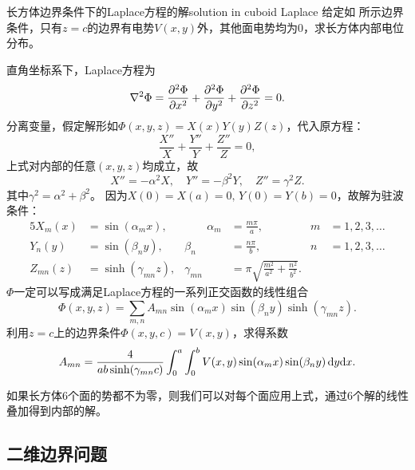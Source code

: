 \begin{example}{长方体边界条件下的Laplace方程的解}{solution in cuboid Laplace}
    给定如 所示边界条件，只有$z = c$的边界有电势$V(x,y)$外，其他面电势均为0，求长方体内部电位分布。
    \begin{notecaptionblock}
        \label{fig:cuboid boundary}
    \end{notecaptionblock}
    直角坐标系下，Laplace方程为
    \[
        \laplacian\Phi = \pv[2]\Phi x + \pv[2]\Phi y + \pv[2]\Phi z = 0.
    \]
    分离变量，假定解形如$\Phi(x,y,z) = X(x)Y(y)Z(z)$，代入原方程：
    \[
        \frac{X''}X + \frac{Y''}Y + \frac{Z''}Z = 0,
    \]
    上式对内部的任意$(x,y,z)$均成立，故
    \[
        X'' = -\alpha^2X,\quad Y'' = -\beta^2Y,\quad Z'' = \gamma^2Z.
    \]
    其中$\gamma^2 = \alpha^2 + \beta^2$。
    因为$X(0) = X(a) = 0,\,Y(0) = Y(b) = 0$，故解为驻波条件：
    \begin{alignat*}{5}
        X_m(x) &= \sin(\alpha_mx),&\qquad\alpha_m &= \frac{m\pi}a,&m &= 1,2,3,\ldots\\
        Y_n(y) &= \sin(\beta_ny),&\beta_n &= \frac{n\pi}b,&n &= 1,2,3,\ldots\\
        Z_{mn}(z) &= \sinh(\gamma_{mn}z),&\gamma_{mn} &= \pi\sqrt{\frac{m^2}{a^2} + \frac{n^2}{b^2}}.
    \end{alignat*}
    $\Phi$一定可以写成满足Laplace方程的一系列正交函数的线性组合
    \begin{equation}
        \label{eq:ed-rectangular-box-expansion}
        \Phi(x,y,z) = \sum_{m,n}A_{mn}\sin(\alpha_mx)\sin(\beta_ny)\sinh(\gamma_{mn}z).
    \end{equation}
    利用$z = c$上的边界条件$\Phi(x,y,c) = V(x,y)$，求得系数
    \begin{equation}
        \label{eq:ed-rectangular-box-coefficients}
        A_{mn} = \frac4{ab\sinh(\gamma_{mn}c)}\int_0^a\int_0^bV(x,y)\sin(\alpha_mx)\sin(\beta_ny)\d y\nd x.
    \end{equation}
\end{example}
\begin{remark}
    如果长方体6个面的势都不为零，则我们可以对每个面应用上式，通过6个解的线性叠加得到内部的解。
\end{remark}

\subsection{二维边界问题}
\label{ssec:2D boundary problem}


